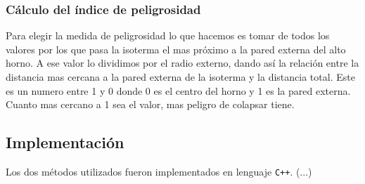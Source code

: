     \subsubsection{Cálculo del índice de peligrosidad}

      Para elegir la medida de peligrosidad lo que hacemos es tomar de todos los valores por los que pasa la isoterma el mas próximo a la pared externa del alto horno. A ese valor lo dividimos por el radio externo, dando así la relación entre la distancia mas cercana a la pared externa de la isoterma y la distancia total.
      Este es un numero entre 1 y 0 donde 0 es el centro del horno y 1 es la pared externa. Cuanto mas cercano a 1 sea el valor, mas peligro de colapsar tiene. 

  \subsection{Implementación}

    Los dos métodos utilizados fueron implementados en lenguaje \texttt{C++}. (...)